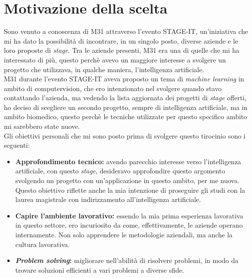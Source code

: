 \section{Motivazione della scelta}\label{sec:choice-motivation}\noindent
Sono venuto a conoscenza di M31 attraverso l'evento STAGE-IT, un'iniziativa che mi ha dato la possibilità di incontrare, in un singolo posto, diverse aziende e le loro proposte di \textit{stage}.
Tra le aziende presenti, M31 era una di quelle che mi ha interessato di più, questo perchè avevo un maggiore interesse a svolgere un progetto che utilizzava, in qualche maniera, l'intelligenza artificiale.\\
M31 durante l'evento STAGE-IT aveva proposto un tema di \textit{machine learning} in ambito di \gls{computervision}, che ero intenzionato nel svolgere quando stavo contattando l'azienda, ma vedendo la lista aggiornata dei progetti di \textit{stage} offerti, ho deciso di scegliere un secondo progetto, sempre di intelligenza artificiale, ma in ambito biomedico, questo perchè le tecniche utilizzate per questo specifico ambito mi sarebbero state nuove.\\
Gli obiettivi personali che mi sono posto prima di svolgere questo tirocinio sono i seguenti:
\begin{itemize}
    \item \textbf{Approfondimento tecnico:} avendo parecchio interesse verso l'intelligenza artificiale, con questo \textit{stage}, desideravo approfondire questo argomento svolgendo un progetto con un'applicazione in questo ambito, per me nuova. Questo obiettivo riflette anche la mia intenzione di proseguire gli studi con la laurea magistrale con indirizzamento all'intelligenza artificiale.
    \item \textbf{Capire l'ambiente lavorativo:} essendo la mia prima esperienza lavorativa in questo settore, ero incuriosito da come, effettivamente, le aziende operano internamente. Non solo apprendere le metodologie aziendali, ma anche la cultura lavorativa.
    \item \textbf{\textit{Problem solving}:} migliorare nell'abilità di risolvere problemi, in modo da trovare soluzioni efficienti a vari problemi a diverse sfide.
\end{itemize}